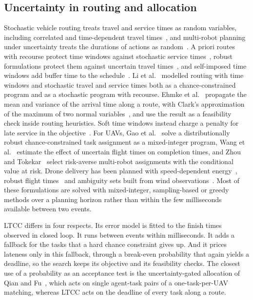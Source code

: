 \documentclass[a4paper,fleqn]{cas-dc}
\newcommand{\mname}{LTCC}  %
\newcounter{prop}
\begin{document}
\subsection{Uncertainty in routing and allocation}
Stochastic vehicle routing treats travel and service times as random variables, including correlated and
time-dependent travel times~\cite{rostami2021correlated,bomboi2022stochastic}, and multi-robot planning under
uncertainty treats the durations of actions as random~\cite{lacerda2022decision}. A priori routes with recourse
protect time windows against stochastic service times~\cite{errico2016apriori}, robust formulations protect them
against uncertain travel times~\cite{agra2013robust}, and self-imposed time windows add buffer time to the
schedule~\cite{jabali2015selfimposed}. Li et al.~\cite{li2010vrptw} modelled routing with time windows and stochastic
travel and service times both as a chance-constrained program and as a stochastic program with recourse. Ehmke et al.~\cite{ehmke2015ensuring} propagate the mean and variance of the arrival time along a route, with
Clark's approximation of the maximum of two normal variables~\cite{clark1961greatest}, and use the result as a
feasibility check inside routing heuristics. Soft time windows instead charge a penalty for late service in the
objective~\cite{tas2013stochastic}. For UAVs, Gao et al.~\cite{gao2025drcc} solve a distributionally robust
chance-constrained task assignment as a mixed-integer program, Wang et al.~\cite{wang2024uncertain} estimate the effect
of uncertain flight times on completion times, and Zhou and Tokekar~\cite{zhou2022risk} select risk-averse multi-robot
assignments with the conditional value at risk. Drone delivery has been planned with speed-dependent
energy~\cite{dukkanci2021energy}, robust flight times~\cite{bruni2023drone} and ambiguity sets built from wind
observations~\cite{cheng2024weather}. Most of these formulations are solved with mixed-integer, sampling-based or greedy
methods over a planning horizon rather than within the few milliseconds available between two events.

\mname{} differs in four respects. Its error model is fitted to the finish times observed in closed loop. It runs
between events within milliseconds. It adds a fallback for the tasks that a hard chance constraint gives up. And it
prices lateness only in this fallback, through a break-even probability that again yields a deadline, so the search
keeps its objective and its feasibility checks. The closest use of a probability as an acceptance test is the
uncertainty-gated allocation of Qian and Fu~\cite{ucdg2026drones}, which acts on single agent-task pairs of a
one-task-per-UAV matching, whereas \mname{} acts on the deadline of every task along a route.
\end{document}
